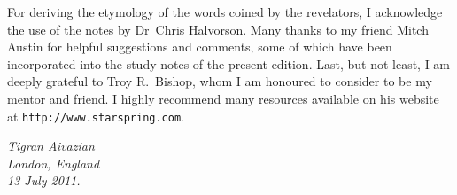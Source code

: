For deriving the etymology of the words coined by the revelators, I acknowledge the use of the notes by Dr~Chris Halvorson.
Many thanks to my friend Mitch Austin for helpful suggestions and comments, some of which have been incorporated into the study notes of the present edition.
Last, but not least, I am deeply grateful to Troy R.~Bishop, whom I am honoured to consider to be my mentor and friend.
I highly recommend many resources available on his website at \texttt{http://www.starspring.com}.


\begin{flushleft}
\itshape
\hspace*{6pt}Tigran Aivazian\\
\hspace*{6pt}London, England\\
\hspace*{6pt}13 July 2011.\\
\end{flushleft}
